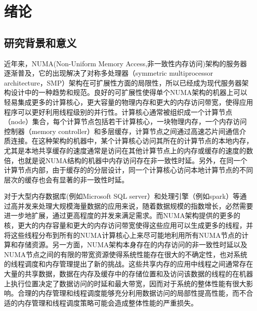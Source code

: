 
\chapter{绪论}
\label{chap:intro}


\section{研究背景和意义}
近年来，NUMA(Non-Uniform Memory Access,非一致性内存访问)\cite{feliu2012understanding}\cite{dashti2013traffic}架构的服务器逐渐普及，它的出现解决了对称多处理器（symmetric multiprocessor architecture，SMP）架构在可扩展性方面的局限性\cite{pusukuri2014shuffling}，所以已经成为现代服务器架构设计中的一种趋势和规范\cite{kashyap2017scalable}\cite{chabbi2016contention}\cite{chabbi2017efficient}。良好的可扩展性使得单个NUMA架构的机器上可以轻易集成更多的计算核心，更大容量的物理内存和更大的内存访问带宽，使得应用程序可以更好利用线程级别的并行性。计算核心通常被组织成一个计算节点（node）集合，每个计算节点包括若干计算核心，一块物理内存，一个内存访问控制器（memory controller）和多层缓存，计算节点之间通过高速芯片间通信介质连接。在这种架构的机器中，某个计算核心访问其所在的计算节点的本地内存，尤其是本地共享缓存的速度通常是访问在其他计算节点上的内存或缓存的速度的数倍，也就是说NUMA结构的机器中内存访问存在非一致性时延。另外，在同一个计算节点内部，由于缓存的的分层设计，同一个计算核心访问本地计算节点的不同层次的缓存也会有显著的非一致性时延\cite{chabbi2015high}。

对于大型内存数据库(例如Microsoft SQL server）\cite{MICROSOFT-SQL}和处理引擎\cite{SAP}\cite{zaharia2010spark}（例如spark）等通过高并发来处理大规模海量数据的应用来说，随着数据规模的指数增长，必然需要进一步地扩展，通过更高程度的并发来满足需求。而NUMA架构提供的更多的核，更大的内存容量和更大的内存访问带宽使得这些应用可以生成更多的线程，并将这些线程分布到所有的NUMA计算核心上来尽可能地利用所有NUMA节点的计算和存储资源。另一方面，NUMA架构本身存在的内存访问的非一致性时延以及NUMA节点之间的有限的带宽资源使得系统性能存在很大的不确定性，也对系统的线程调度和内存管理提出了新的挑战\cite{wang2012performance}\cite{boyd2008corey}。这些共享内存的应用中线程之间通常存在大量的共享数据，数据在内存及缓存中的存储位置和及访问该数据的线程的在机器上执行位置决定了数据访问的时延和最大带宽，因而对于系统的整体性能有很大影响。合理的内存管理和线程调度能够充分利用数据访问的局部性提高性能，而不合适的内存管理和线程调度策略可能会造成整体性能的严重损失。

